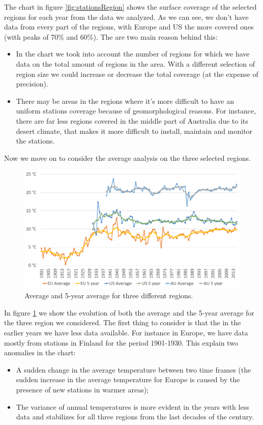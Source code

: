 \documentclass{vldb}
\begin{document}
The chart in figure \ref{fig:stationsRegion} shows the surface coverage of the selected regions for each year from the data we analyzed. As we can see, we don't have data from every part of the regions, with Europe and US the more covered ones (with peaks of 70\% and 60\%). The are two main reason behind this:
\begin{itemize}
    \item In the chart we took into account the number of regions for which we have data on the total amount of regions in the area. With a different selection of region size we could increase or decrease the total coverage (at the expense of precision).
    \item There may be areas in the regions where it's more difficult to have an uniform stations coverage because of geomorphological reasons. For instance, there are far less regions covered in the middle part of Australia due to its desert climate, that makes it more difficult to install, maintain and monitor the stations.
\end{itemize}

Now we move on to consider the average analysis on the three selected regions. 

\begin{figure}[tbh]
\includegraphics[width=1\linewidth]{averageRegions}
\caption{Average and 5-year average for three different regions.}
\label{fig:averageRegions}
\end{figure}

In figure \ref{fig:averageRegions} we show the evolution of both the average and the 5-year average for the three region we considered. The first thing to consider is that the in the earlier years we have less data available. For instance in Europe, we have data mostly from stations in Finland for the period 1901-1930. This explain two anomalies in the chart:
\begin{itemize}
    \item A sudden change in the average temperature between two time frames (the sudden increase in the average temperature for Europe is caused by the presence of new stations in warmer areas);
    \item The variance of annual temperatures is more evident in the years with less data and stabilizes for all three regions from the last decades of the century.
\end{itemize}
\end{document}
